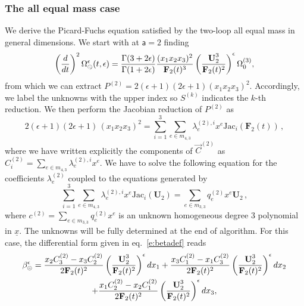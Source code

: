 \documentclass[a4paper,12pt]{article}
\numberwithin{equation}{section}
\numberwithin{figure}{section}
\def\su{\circleddash}
\begin{document}
\subsubsection{The all equal mass case}\label{sec:2sunset1mass}
We derive the Picard-Fuchs equation satisfied by the two-loop all
equal mass in general dimensions. 
We  start with at $\mathsf{a}=2$ finding
\begin{equation}
 \left(d\over dt\right)^2
 \Omega_{\su}^{\epsilon}(t,\epsilon)={\Gamma(3+2\epsilon)\over\Gamma(1+2\epsilon)} {(x_1x_2x_3)^2\over \textbf{F}_2(t)^3}
 \left(\textbf{U}_2^3\over \textbf{F}_2(t)^2\right)^\epsilon  \Omega_0^{(3)} ,
\end{equation}
from which we can extract $P^{(2)}=2 (\epsilon +1) (2 \epsilon +1)(x_1x_2x_3)^2$. 
%
Accordingly, we label the unknowns with the upper index so $S^{(k)}$ indicates the $k$-th reduction. We then  perform the Jacobian reduction of $P^{(2)}$ as
\begin{equation}\label{e:reduc}
  2 (\epsilon +1) (2 \epsilon +1)\,  (x_1x_2x_3)^2= \sum_{i=1}^3 
  \sum_{e\in m_{4,3}}\lambda^{(2),i}_{e} x^e \text{Jac}_i  (\mathbf{F}_2(t)) \,,
\end{equation}
%
where we have written explicitly the components of $\vec{C}^{(2)}$ as $C^{(2)}_i=\sum_{e\in m_{4,3}}\lambda^{(2),i}_{e} x^e$.
We have to solve the following equation for the coefficients $\lambda_e^{(2)}$ coupled to the equations generated by
\begin{equation}\label{e:C2red}
\sum_{i=1}^3 
\sum_{e\in m_{4,3}}\lambda^{(2),i}_{e} x^e \text{Jac}_i(\mathbf U_2) = \sum_{e\in m_{3,3}} q^{(2)}_e x^e \textbf{U}_2 \,, 
%
\end{equation}
where $c^{(2)}=\sum_{e\in m_{3,3}} q^{(2)}_e x^e$ is an unknown homogeneous degree 3 polynomial
in $\underline x$.
%
The unknowns will be fully determined at the end of  algorithm. For this case, 
the differential form given in eq.~\eqref{e:betadef} reads
%
 \begin{multline}
 	\label{eq:beta-equalmass-sunset}
   \beta_\su^\epsilon=   {x_2  C_3^{(2)}-x_3  C_2^{(2)}\over
   2  \textbf{F}_2(t)^2} \left(\textbf{U}_2^3\over \textbf{F}_2(t)^2\right)^\epsilon dx_1+   {x_3  C_1^{(2)}-x_1 C_3^{(2)}\over
    2 \textbf{F}_2(t)^2} \left(\textbf{U}_2^3\over \textbf{F}_2(t)^2\right)^\epsilon dx_2\cr
   +  {x_1  C_2^{(2)}-x_2  C_1^{(2)}\over
    2 \textbf{F}_2(t)^2} \left(\textbf{U}_2^3\over \textbf{F}_2(t)^2\right)^\epsilon dx_3, 
 \end{multline}
\end{document}
